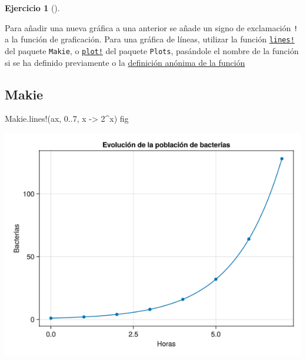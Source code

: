 \documentclass[
  a4paper,
]{scrreport}
\newenvironment{Shaded}{\begin{snugshade}}{\end{snugshade}}
\newcommand{\FloatTok}[1]{\textcolor[rgb]{0.68,0.00,0.00}{#1}}
\newcommand{\FunctionTok}[1]{\textcolor[rgb]{0.28,0.35,0.67}{#1}}
\newcommand{\NormalTok}[1]{\textcolor[rgb]{0.00,0.23,0.31}{#1}}
\newcommand{\OperatorTok}[1]{\textcolor[rgb]{0.37,0.37,0.37}{#1}}
\theoremstyle{definition}
\newtheorem{exercise}{Ejercicio}[chapter]
\theoremstyle{remark}
\begin{document}
\begin{exercise}[]
\begin{enumerate}
\begin{tcolorbox}
  Para añadir una nueva gráfica a una anterior se añade un signo de
  exclamación \texttt{!} a la función de graficación. Para una gráfica
  de líneas, utilizar la función
  \href{https://aprendeconalf.es/manual-julia/graficos.html\#diagrama-de-l\%C3\%ADneas}{\texttt{lines!}}
  del paquete \texttt{Makie}, o
  \href{https://aprendeconalf.es/manual-julia/graficos.html\#gr\%C3\%A1fica-de-una-funci\%C3\%B3n-de-una-variable}{\texttt{plot!}}
  del paquete \texttt{Plots}, pasándole el nombre de la función si se ha
  definido previamente o la
  \href{https://aprendeconalf.es/manual-julia/funciones.html\#funciones-an\%C3\%B3nimas}{definición
  anónima de la función}

  \end{tcolorbox}

  \begin{tcolorbox}[enhanced jigsaw, bottomtitle=1mm, rightrule=.15mm, left=2mm, colback=white, title=\textcolor{quarto-callout-tip-color}{\faLightbulb}\hspace{0.5em}{Solución}, bottomrule=.15mm, colframe=quarto-callout-tip-color-frame, toprule=.15mm, leftrule=.75mm, opacityback=0, coltitle=black, breakable, colbacktitle=quarto-callout-tip-color!10!white, arc=.35mm, toptitle=1mm, titlerule=0mm, opacitybacktitle=0.6]

  \section{Makie}

\begin{Shaded}
\begin{Highlighting}[]
\NormalTok{Makie.}\FunctionTok{lines!}\NormalTok{(ax, }\FloatTok{0}\OperatorTok{..}\FloatTok{7}\NormalTok{, x }\OperatorTok{{-}\textgreater{}} \FloatTok{2}\OperatorTok{\^{}}\NormalTok{x)}
\NormalTok{fig}
\end{Highlighting}
\end{Shaded}

  \includegraphics{03-funciones-elementales_files/figure-pdf/cell-5-output-1.png}


\end{tcolorbox}
\end{enumerate}
\end{exercise}
\end{document}
